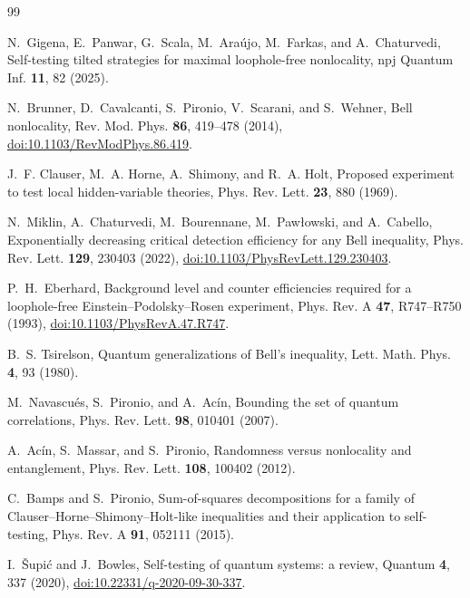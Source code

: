 \documentclass[11pt]{article}
\theoremstyle{remark}\newtheorem{remark}[theorem]{Remark}
\begin{document}
\begin{thebibliography}{99}
\small

N.~Gigena, E.~Panwar, G.~Scala, M.~Ara\'ujo, M.~Farkas, and A.~Chaturvedi,
Self-testing tilted strategies for maximal loophole-free nonlocality,
npj Quantum Inf. \textbf{11}, 82 (2025).

N.~Brunner, D.~Cavalcanti, S.~Pironio, V.~Scarani, and S.~Wehner,
Bell nonlocality, Rev. Mod. Phys. \textbf{86}, 419--478 (2014),
\href{https://doi.org/10.1103/RevModPhys.86.419}{doi:10.1103/RevModPhys.86.419}.

J.~F. Clauser, M.~A. Horne, A.~Shimony, and R.~A. Holt,
Proposed experiment to test local hidden-variable theories,
Phys. Rev. Lett. \textbf{23}, 880 (1969).

N.~Miklin, A.~Chaturvedi, M.~Bourennane, M.~Paw\l{}owski, and A.~Cabello,
Exponentially decreasing critical detection efficiency for any Bell inequality,
Phys. Rev. Lett. \textbf{129}, 230403 (2022),
\href{https://doi.org/10.1103/PhysRevLett.129.230403}{doi:10.1103/PhysRevLett.129.230403}.

P.~H.~Eberhard,
Background level and counter efficiencies required for a loophole-free Einstein--Podolsky--Rosen experiment,
Phys. Rev. A \textbf{47}, R747--R750 (1993),
\href{https://doi.org/10.1103/PhysRevA.47.R747}{doi:10.1103/PhysRevA.47.R747}.

B.~S. Tsirelson,
Quantum generalizations of Bell's inequality,
Lett. Math. Phys. \textbf{4}, 93 (1980).

M.~Navascu\'es, S.~Pironio, and A.~Ac\'in,
Bounding the set of quantum correlations,
Phys. Rev. Lett. \textbf{98}, 010401 (2007).

A.~Ac\'in, S.~Massar, and S.~Pironio,
Randomness versus nonlocality and entanglement,
Phys. Rev. Lett. \textbf{108}, 100402 (2012).

C.~Bamps and S.~Pironio,
Sum-of-squares decompositions for a family of Clauser--Horne--Shimony--Holt-like inequalities and their application to self-testing,
Phys. Rev. A \textbf{91}, 052111 (2015).

I.~\v{S}upi\'c and J.~Bowles,
Self-testing of quantum systems: a review,
Quantum \textbf{4}, 337 (2020),
\href{https://doi.org/10.22331/q-2020-09-30-337}{doi:10.22331/q-2020-09-30-337}.


\end{thebibliography}
\end{document}
